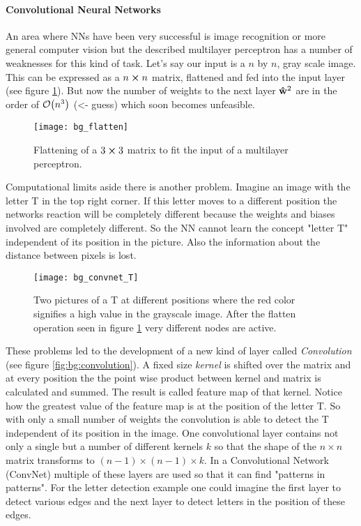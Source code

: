 \paragraph{Convolutional Neural Networks}
An area where NNs have been very successful is image recognition or more general computer vision but the described multilayer perceptron has a number of weaknesses for this kind of task. Let's say our input is a $n$ by $n$, gray scale image. This can be expressed as a $n \cp n$ matrix, flattened and fed into the input layer (see figure \ref{fig:bg:flatten}). But now the number of weights to the next layer $\vu{w}^2$ are in the order of
$\order{n^3}$ (<- guess)
which soon becomes unfeasible.

\begin{figure}[H]
    \centering
    \texttt{[image: bg\_flatten]}
    \caption{Flattening of a $3\cp3$ matrix to fit the input of a multilayer perceptron.}
    \label{fig:bg:flatten}
\end{figure}

Computational limits aside there is another problem. Imagine an image with the letter T in the top right corner. If this letter moves to a different position the networks reaction will be completely different because the weights and biases involved are completely different. So the NN cannot learn the concept "letter T" independent of its position in the picture. Also the information about the distance between pixels is lost.

\begin{figure}[H]
    \centering
    \texttt{[image: bg\_convnet\_T]}
    \caption{Two pictures of a T at different positions where the red color signifies a high value in the grayscale image. After the flatten operation seen in figure \ref{fig:bg:flatten} very different nodes are active.}
    \label{fig:bg:convnet_T}
\end{figure}

These problems led to the development of a new kind of layer called \textit{Convolution} (see figure \ref{fig:bg:convolution}). A fixed size \textit{kernel} is shifted over the matrix and at every position the the point wise product between kernel and matrix is calculated and summed. The result is called feature map of that kernel. Notice how the greatest value of the feature map is at the position of the letter T. So with only a small number of weights the convolution is able to detect the T independent of its position in the image. One convolutional layer contains not only a single but a number of different kernels $k$ so that the shape of the $n \times n$ matrix transforms to $(n-1) \times (n-1) \times k$. In a Convolutional Network (ConvNet) multiple of these layers are used so that it can find "patterns in patterns". For the letter detection example one could imagine the first layer to detect various edges and the next layer to detect letters in the position of these edges.


